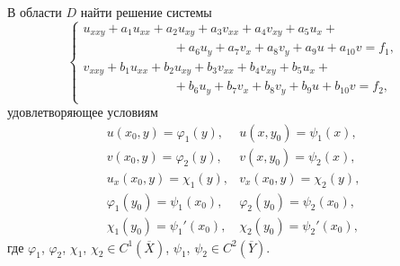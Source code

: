 \begin{example} В области $D$ найти решение системы
\begin{equation}
\left\{
\begin{array}{l}
u_{xxy}+a_{1}u_{xx}+a_{2}u_{xy}+a_{3}v_{xx}+a_{4}v_{xy}+a_{5}u_{x}+\\
\hspace{3cm}+a_{6}u_{y}+a_{7}v_{x}+a_{8}v_{y}+a_{9}u+a_{10}v=f_{1},\\
v_{xxy}+b_{1}u_{xx}+b_{2}u_{xy}+b_{3}v_{xx}+b_{4}v_{xy}+b_{5}u_{x}+\\
\hspace{3cm}
+b_{6}u_{y}+b_{7}v_{x}+b_{8}v_{y}+b_{9}u+b_{10}v=f_{2},\\
\end{array}
\right.
 \label{soz:eq37}
\end{equation}
удовлетворяющее условиям
\begin{equation}
\begin{array}{ll}
u(x_{0},y)=\varphi_{1}(y),& u(x,y_{0})=\psi_{1}(x),\\
v(x_{0},y)=\varphi_{2}(y),& v(x,y_{0})=\psi_{2}(x),\\
u_{x}(x_{0},y)=\chi_{1}(y),& v_{x}(x_{0},y)=\chi_{2}(y),\\
\varphi_{1}(y_{0})=\psi_{1}(x_{0}),& \varphi_{2}(y_{0})=\psi_{2}(x_{0}),\\ 
\chi_{1}(y_{0})=\psi_{1}' (x_{0}),& \chi_{2}(y_{0})=\psi_{2}' (x_{0}),
\end{array}
 \label{soz:eq38}
\end{equation}
где $\varphi_{1}$, $\varphi_{2}$, $\chi_{1}$, $\chi_{2} \in C^{1}(\overline{X})$,
$\psi_{1}$, $\psi_{2} \in C^{2}(\overline{Y})$.
\end{example}

\medskip


